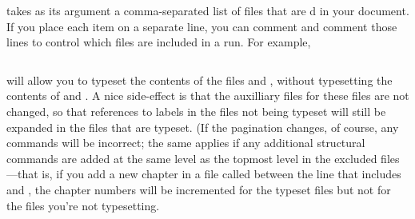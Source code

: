  takes as its argument a comma-separated list of
files that are d in your document.  If you place each
item on a separate line, you can comment and comment those lines to
control which files are included in a \latex run.  For example,
\begin{quote}
\begin{verbatim}

\end{verbatim}
\end{quote}
will allow you to typeset the contents of the files  and
, without typesetting the contents of  and .
A nice side-effect is that the auxilliary files for these files are
not changed, so that references to labels in the files not being
typeset will still be expanded in the files that are typeset.  (If the
pagination changes, of course, any  commands will be
incorrect; the same applies if any additional structural commands are
added at the same level as the topmost level in the excluded
files---that is, if you add a new chapter in a file called 
between the line that includes  and , the chapter
numbers will be incremented for the typeset files but not for the
files you're not typesetting.

